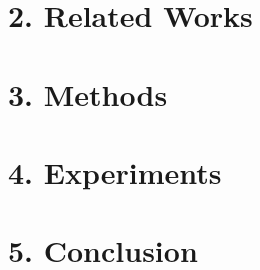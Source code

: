 \section{2. Related Works}


\section{3. Methods}


\section{4. Experiments}


\section{5. Conclusion}






